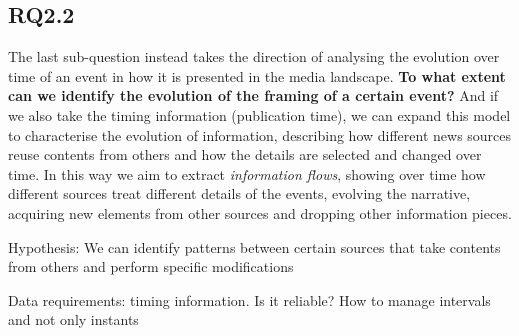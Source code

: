 \subsection{RQ2.2}
The last sub-question instead takes the direction of analysing the evolution over time of an event in how it is presented in the media landscape.
\textbf{To what extent can we identify the evolution of the framing of a certain event?}
And if we also take the timing information (publication time), we can expand this model to characterise the evolution of information, describing how different news sources reuse contents from others and how the details are selected and changed over time.
In this way we aim to extract \textit{information flows}, showing over time how different sources treat different details of the events, evolving the narrative, acquiring new elements from other sources and dropping other information pieces.

Hypothesis: We can identify patterns between certain sources that take contents from others and perform specific modifications

Data requirements: timing information.
Is it reliable? How to manage intervals and not only instants









